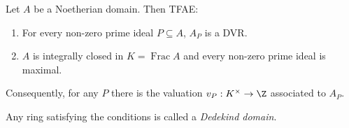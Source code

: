 \documentclass[a4paper]{article}
\DeclareMathOperator{\Frac}{Frac}
\begin{document}
\begin{proposition}
  Let \(A\) be a Noetherian domain. Then TFAE:
  \begin{enumerate}
  \item For every non-zero prime ideal \(P \subseteq A\), \(A_P\) is a DVR.
  \item \(A\) is integrally closed in \(K = \Frac A\) and every non-zero prime ideal is maximal.
  \end{enumerate}
\end{proposition}

Consequently, for any \(P\) there is the valuation \(v_P: K^\times \to \Z\) associated to \(A_P\).

\begin{definition}
  Any ring satisfying the conditions is called a \emph{Dedekind domain}.
\end{definition}
\end{document}
